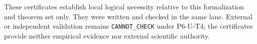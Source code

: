 These certificates establish local logical necessity relative to this
formalization and theorem set only. They were written and checked in the same
lane. External or independent validation remains \texttt{CANNOT\_CHECK} under
P6-U-T4; the certificates provide neither empirical evidence nor external
scientific authority.

